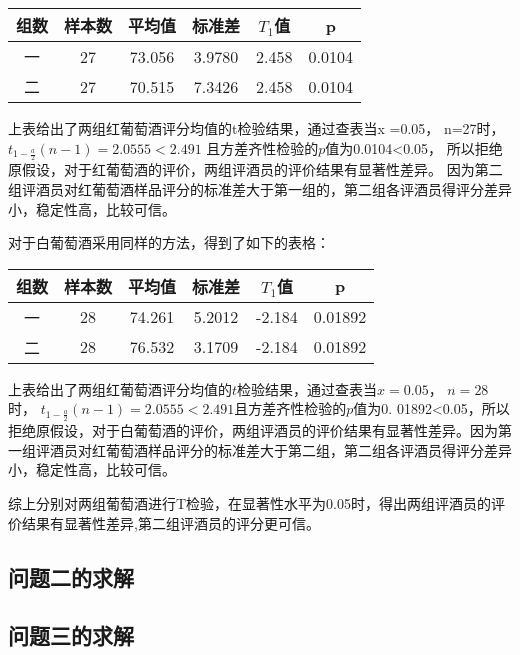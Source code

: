 \documentclass[UTF8]{ctexart}
\begin{document}
\begin{center}
	\begin{tabular}{||c c c c c c||}
		\hline
		组数 & 样本数 & 平均值 & 标准差 & $T_1$值 & p      \\ [0.5ex]
		\hline
		一   & 27     & 73.056 & 3.9780 & 2.458   & 0.0104 \\
		\hline
		二   & 27     & 70.515 & 7.3426 & 2.458   & 0.0104 \\
		\hline
	\end{tabular}
\end{center}

上表给出了两组红葡萄酒评分均值的t检验结果，通过查表当x =0.05， n=27时， $t_{1-\frac{a}{2}}(n-1)=2.0555<2.491$
且方差齐性检验的$p$值为0.0104<0.05，
所以拒绝原假设，对于红葡萄酒的评价，两组评酒员的评价结果有显著性差异。
因为第二组评酒员对红葡萄酒样品评分的标准差大于第一组的，第二组各评酒员得评分差异小，稳定性高，比较可信。

对于白葡萄酒采用同样的方法，得到了如下的表格：
\begin{center}
	\begin{tabular}{||c c c c c c||}
		\hline
		组数 & 样本数 & 平均值 & 标准差 & $T_1$值 & p       \\ [0.5ex]
		\hline
		一   & 28     & 74.261 & 5.2012 & -2.184  & 0.01892 \\
		\hline
		二   & 28     & 76.532 & 3.1709 & -2.184  & 0.01892 \\
		\hline
	\end{tabular}
\end{center}

上表给出了两组红葡萄酒评分均值的$t$检验结果，通过查表当$x=0.05$， $n=28$时， $t_{1-\frac{a}{2}}(n-1)=2.0555<2.491$且方差齐性检验的$p$值为0. 01892<0.05，所以拒绝原假设，对于白葡萄酒的评价，两组评酒员的评价结果有显著性差异。因为第一组评酒员对红葡萄酒样品评分的标准差大于第二组，第二组各评酒员得评分差异小，稳定性高，比较可信。

综上分别对两组葡萄酒进行T检验\cite{de2013using}，在显著性水平为0.05时，得出两组评酒员的评价结果有显著性差异,第二组评酒员的评分更可信。


\subsection{问题二的求解}

\subsection{问题三的求解}
\end{document}
